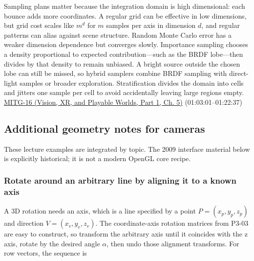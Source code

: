 Sampling plans matter because the integration domain is high dimensional: each bounce adds more coordinates. A regular grid can be effective in low dimensions, but grid cost scales like \(m^d\) for \(m\) samples per axis in dimension \(d\), and regular patterns can alias against scene structure. Random Monte Carlo error has a weaker dimension dependence but converges slowly. Importance sampling chooses a density proportional to expected contribution---such as the BRDF lobe---then divides by that density to remain unbiased. A bright source outside the chosen lobe can still be missed, so hybrid samplers combine BRDF sampling with direct-light samples or broader exploration. Stratification divides the domain into cells and jitters one sample per cell to avoid accidentally leaving large regions empty. \href{../07-Vision-XR-and-Playable-Worlds-P01/main.pdf\#nameddest=04-visual-computing-ii-ch036-mitg-16---global-illumination}{MITG-16 (Vision, XR, and Playable Worlds, Part 1, Ch. 5)} (01:03:01--01:22:37)

\subsection{Additional geometry notes for cameras}\label{03-visual-computing-i-ch011-additional-geometry-notes-for-cameras}

\hypertarget{03-visual-computing-i-ch011-additional-geometry-notes-for-cameras}{}

These lecture examples are integrated by topic. The 2009 interface material below is explicitly historical; it is not a modern OpenGL core recipe.

\subsubsection{Rotate around an arbitrary line by aligning it to a known axis}\label{03-visual-computing-i-ch011-rotate-around-an-arbitrary-line-by-aligning-it-to-a-known-axis}

\hypertarget{03-visual-computing-i-ch011-rotate-around-an-arbitrary-line-by-aligning-it-to-a-known-axis}{}

A 3D rotation needs an axis, which is a line specified by a point \(P=(x_p,y_p,z_p)\) and direction \(V=(x_v,y_v,z_v)\). The coordinate-axis rotation matrices from P3-03 are easy to construct, so transform the arbitrary axis until it coincides with the z axis, rotate by the desired angle \(\alpha\), then undo those alignment transforms. For row vectors, the sequence is

